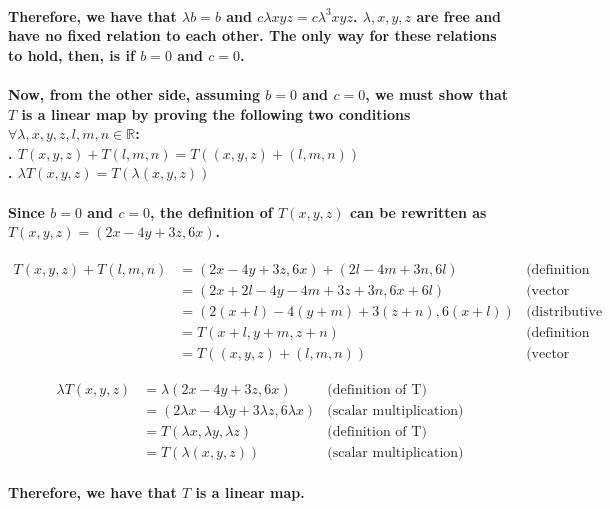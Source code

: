 \documentclass{article}
\begin{document}
\paragraph{\large
Therefore, we have that $\lambda b = b$ and $c\lambda xyz = c\lambda^3xyz$. $\lambda,x,y,z$ are free and have no fixed relation to each other. The only way for these relations to hold, then, is if $b = 0$ and $c = 0$.}

\paragraph{\large
Now, from the other side, assuming $b = 0$ and $c = 0$, we must show that $T$ is a linear map by proving the following two conditions $\forall \lambda,x,y,z,l,m,n \in \mathbb{R}$:
\\. $T(x, y, z) + T(l, m, n) = T((x, y, z) + (l, m, n))$
\\. $\lambda T(x, y, z) = T(\lambda(x, y, z))$}

\paragraph{\large
Since $b=0$ and $c=0$, the definition of $T(x, y, z)$ can be rewritten as $T(x,y,z) = (2x-4y+3z,6x)$.}

\begin{align*}
    T(x,y,z) + T(l,m,n) &= (2x-4y+3z,6x) + (2l-4m+3n,6l) & \text{(definition of T)}\\
    &= (2x+2l-4y-4m+3z+3n, 6x+6l) & \text{(vector addition)}\\
    &= (2(x+l)-4(y+m)+3(z+n),6(x+l)) & \text{(distributive property)}\\
    &= T(x+l,y+m,z+n) & \text{(definition of T)}\\
    &= T((x,y,z)+(l,m,n)) & \text{(vector addition)}
\end{align*}

\begin{align*}
    \lambda T(x,y,z) &= \lambda (2x-4y+3z,6x) & \text{(definition of T)}\\
    &= (2\lambda x-4\lambda y+3\lambda z,6\lambda x) & \text{(scalar multiplication)}\\
    &= T(\lambda x, \lambda y, \lambda z) & \text{(definition of T)}\\
    &= T(\lambda (x,y,z)) & \text{(scalar multiplication)}
\end{align*}

\paragraph{\large
Therefore, we have that $T$ is a linear map.}
\end{document}
